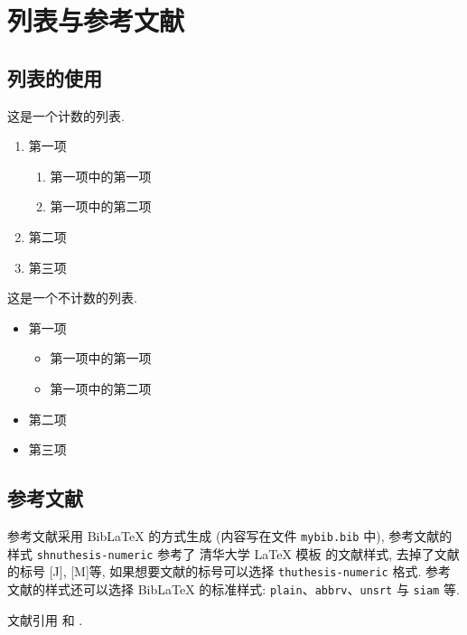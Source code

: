 \documentclass{shnuthesis}
\begin{document}

\chapter{列表与参考文献}

\section{列表的使用}

这是一个计数的列表.
\begin{enumerate}
	\item 第一项
		\begin{enumerate}
			\item 第一项中的第一项
			\item 第一项中的第二项
		\end{enumerate}
	\item 第二项
	\item 第三项
\end{enumerate}


这是一个不计数的列表.
\begin{itemize}%
	\item 第一项
	\begin{itemize}
		\item 第一项中的第一项
		\item 第一项中的第二项
	\end{itemize}
	\item 第二项
	\item 第三项
\end{itemize}


\section{参考文献}

参考文献采用 BibLaTeX 的方式生成 (内容写在文件 \verb|mybib.bib| 中), 参考文献的样式 \verb|shnuthesis-numeric| 参考了 清华大学 LaTeX 模板 \href{https://github.com/tuna/thuthesis}{} 的文献样式, 去掉了文献的标号 [J], [M]等, 如果想要文献的标号可以选择  \verb|thuthesis-numeric| 格式. 参考文献的样式还可以选择 BibLaTeX 的标准样式: \verb|plain|、\verb|abbrv|、\verb|unsrt| 与 \verb|siam| 等.

文献引用 \cite{Adams2003, Tadmor2012}和 \cite{LiLiu1997}.


\end{document}
